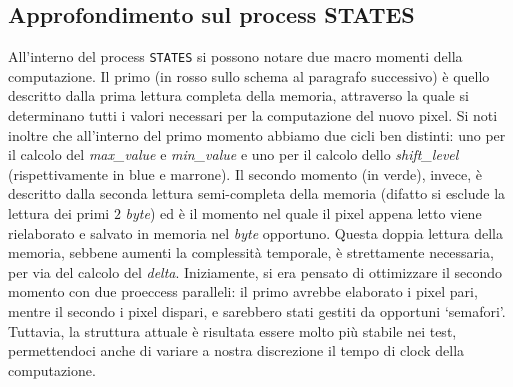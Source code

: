 \documentclass[11pt, a4paper]{article}
\begin{document}
\subsection{Approfondimento sul process STATES}
All'interno del process \texttt{STATES} si possono notare due macro momenti della computazione. Il primo (in rosso sullo schema al paragrafo successivo) è quello descritto dalla prima lettura completa della memoria, attraverso la quale si determinano tutti i valori necessari per la computazione del nuovo pixel. Si noti inoltre che all'interno del primo momento abbiamo due cicli ben distinti: uno per il calcolo del \textit{max\_value} e \textit{min\_value} e uno per il calcolo dello \textit{shift\_level} (rispettivamente in blue e marrone). Il secondo momento (in verde), invece, è descritto dalla seconda lettura semi-completa della memoria (difatto si esclude la lettura dei primi $2$ \textit{byte}) ed è il momento nel quale il pixel appena letto viene rielaborato e salvato in memoria nel \textit{byte} opportuno. Questa doppia lettura della memoria, sebbene aumenti la complessità temporale, è strettamente necessaria, per via del calcolo del \textit{delta}. Iniziamente, si era pensato di ottimizzare il secondo momento con due proeccess paralleli: il primo avrebbe elaborato i pixel pari, mentre il secondo i pixel dispari, e sarebbero stati gestiti da opportuni `semafori'. Tuttavia, la struttura attuale è risultata essere molto più stabile nei test, permettendoci anche di variare a nostra discrezione il tempo di clock della computazione.
\pagebreak
\end{document}
